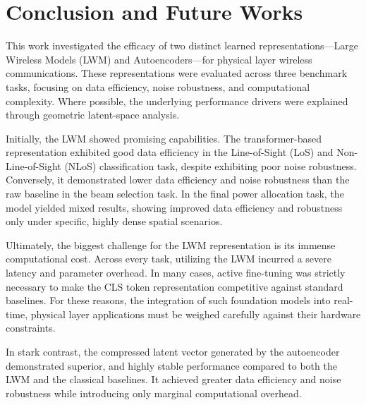 \chapter{Conclusion and Future Works}\label{sec:conclusion}

This work investigated the efficacy of two distinct learned representations—Large Wireless Models (LWM) and Autoencoders—for physical layer wireless communications. These representations were evaluated across three benchmark tasks, focusing on data efficiency, noise robustness, and computational complexity. Where possible, the underlying performance drivers were explained through geometric latent-space analysis.

Initially, the LWM showed promising capabilities. The transformer-based representation exhibited good data efficiency in the Line-of-Sight (LoS) and Non-Line-of-Sight (NLoS) classification task, despite exhibiting poor noise robustness. Conversely, it demonstrated lower data efficiency and noise robustness than the raw baseline in the beam selection task. In the final power allocation task, the model yielded mixed results, showing improved data efficiency and robustness only under specific, highly dense spatial scenarios.

Ultimately, the biggest challenge for the LWM representation is its immense computational cost. Across every task, utilizing the LWM incurred a severe latency and parameter overhead. In many cases, active fine-tuning was strictly necessary to make the CLS token representation competitive against standard baselines. For these reasons, the integration of such foundation models into real-time, physical layer applications must be weighed carefully against their hardware constraints.

In stark contrast, the compressed latent vector generated by the autoencoder demonstrated superior, and highly stable performance compared to both the LWM and the classical baselines. It achieved greater data efficiency and noise robustness while introducing only marginal computational overhead.

